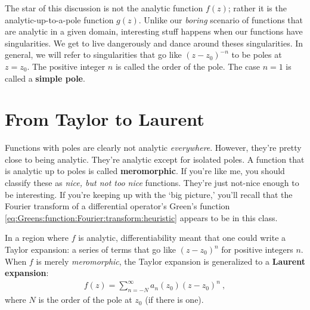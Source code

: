 \documentclass[
  11pt,
	colorful,
	raggedright,
]{tufte-style-thesis-flip}
\begin{document}
The star of this discussion is not the analytic function $f(z)$; rather it is the analytic-up-to-a-pole function $g(z)$. Unlike our \emph{boring} scenario of functions that are analytic in a given domain, interesting stuff happens when our functions have singularities. We get to live dangerously and dance around theses singularities. In general, we will refer to singularities that go like $(z-z_0)^{-n}$ to be poles at $z=z_0$. The positive integer $n$ is called the order of the pole. The case $n=1$ is called a \textbf{simple pole}.

\section{From Taylor to Laurent}

Functions with poles are clearly not analytic \emph{everywhere}. However, they're pretty close to being analytic. They're analytic except for isolated poles. A function that is analytic up to poles is called \textbf{meromorphic}. If you're like me, you should classify these as \emph{nice, but not too nice} functions. They're just not-nice enough to be interesting. If you're keeping up with the `big picture,' you'll recall that the Fourier transform of a differential operator's Green's function  \eqref{eq:Greens:function:Fourier:transform:heuristic} appears to be in this class.

In a region where $f$ is analytic, differentiability meant that one could write a Taylor expansion: a series of terms that go like $(z-z_0)^n$ for positive integers $n$. When $f$ is merely \emph{meromorphic}, the Taylor expansion is generalized to a \textbf{Laurent expansion}:
\begin{align}
  f(z) = \sum_{n=-N}^\infty  a_n(z_0) (z-z_0)^n \ ,
\end{align}
where $N$ is the order of the pole at $z_0$ (if there is one). 
\end{document}

